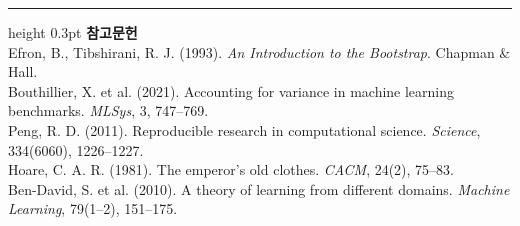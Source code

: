 \documentclass[10pt]{article}
\begin{document}
\vspace{0.6em}
\hrule height 0.3pt
\vspace{0.5em}
{\footnotesize
\textbf{참고문헌}\\[0.3em]
Efron, B., Tibshirani, R. J. (1993). \emph{An Introduction to the Bootstrap}.
Chapman \& Hall.\\[0.15em]
Bouthillier, X. et al. (2021). Accounting for variance in machine learning
benchmarks. \emph{MLSys}, 3, 747--769.\\[0.15em]
Peng, R. D. (2011). Reproducible research in computational science.
\emph{Science}, 334(6060), 1226--1227.\\[0.15em]
Hoare, C. A. R. (1981). The emperor's old clothes. \emph{CACM}, 24(2), 75--83.\\[0.15em]
Ben-David, S. et al. (2010). A theory of learning from different domains.
\emph{Machine Learning}, 79(1--2), 151--175.
}
\end{document}

